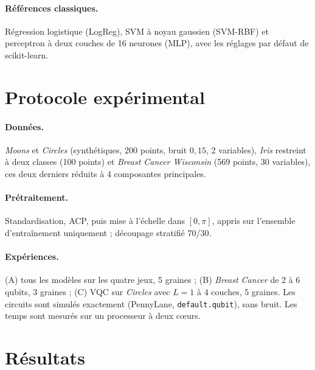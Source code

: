 \documentclass[10pt,a4paper,twocolumn]{article}
\begin{document}
\paragraph{Références classiques.}
Régression logistique (LogReg), SVM à noyau gaussien (SVM-RBF) et perceptron à deux couches de
16 neurones (MLP), avec les réglages par défaut de scikit-learn.

\section{Protocole expérimental}

\paragraph{Données.} \emph{Moons} et \emph{Circles} (synthétiques, 200 points, bruit $0{,}15$,
2 variables), \emph{Iris} restreint à deux classes (100 points) et \emph{Breast Cancer Wisconsin}
(569 points, 30 variables), ces deux derniers réduits à 4 composantes principales.

\paragraph{Prétraitement.} Standardisation, ACP, puis mise à l'échelle dans $[0,\pi]$, appris sur
l'ensemble d'entraînement uniquement ; découpage stratifié 70/30.

\paragraph{Expériences.} (A) tous les modèles sur les quatre jeux, 5 graines ;
(B) \emph{Breast Cancer} de 2 à 6 qubits, 3 graines ; (C) VQC sur \emph{Circles} avec
$L = 1$ à $4$ couches, 5 graines. Les circuits sont simulés exactement (PennyLane,
\texttt{default.qubit}), sans bruit. Les temps sont mesurés sur un processeur à deux cœurs.

\section{Résultats}

\begin{table}[t]
\centering
{}
\caption{Précision sur l'ensemble de test (moyenne $\pm$ écart-type sur 5 graines). En gras : meilleure
moyenne par jeu de données. Le trait sépare modèles classiques (haut) et quantiques (bas).}
\label{tab:acc}
\end{table}
\end{document}

